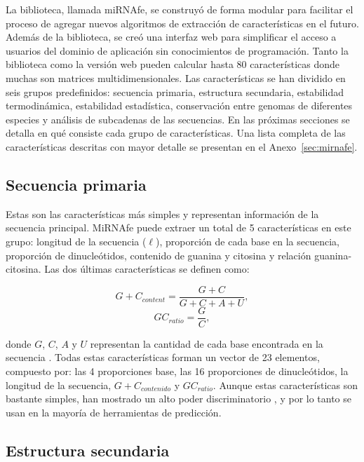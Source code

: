 La biblioteca, llamada miRNAfe, se construyó de forma modular para facilitar el proceso de agregar nuevos algoritmos de extracción de características en el
futuro. Además de la biblioteca, se creó una interfaz web para simplificar el acceso a usuarios del dominio de aplicación sin conocimientos de programación.
Tanto la biblioteca como la versión web pueden calcular hasta 80 características donde muchas son matrices multidimensionales. Las características se han
dividido en seis grupos predefinidos: secuencia primaria, estructura secundaria, estabilidad termodinámica, estabilidad estadística, conservación entre genomas
de diferentes especies y análisis de subcadenas de las secuencias. En las próximas secciones se detalla en qué consiste cada grupo de características. Una lista
completa de las características descritas con mayor detalle se presentan en el Anexo~\ref{sec:mirnafe}.


\subsection{Secuencia primaria}

Estas son las características más simples y representan información de la secuencia principal. MiRNAfe puede extraer un total de 5 características en este
grupo: longitud de la secuencia ($\ell$), proporción de cada base en la secuencia, proporción de dinucleótidos, contenido de guanina y citosina y relación
guanina-citosina. Las dos últimas características se definen como:

\begin{equation} \label{eq:contenidoGC}
	{G+C}_{content} = \frac{G+C}{G+C+A+U},
\end{equation}
\begin{equation} \label{eq:GCratio}
	{GC}_{ratio} = \frac{G}{C},
\end{equation}

\noindent donde $G$, $C$, $A$ y $U$ representan la cantidad de cada base encontrada en la secuencia \citep{hertel2006hairpins}. Todas estas características
forman un vector de 23 elementos, compuesto por: las 4 proporciones base, las 16 proporciones de dinucleótidos, la longitud de la secuencia, ${G+C}_{contenido}$
y ${GC}_{ratio}$. Aunque estas características son bastante simples, han mostrado un alto poder discriminatorio \citep{batuwita2009micropred}, y por lo tanto se
usan en la mayoría de herramientas de predicción.

\subsection{Estructura secundaria}

